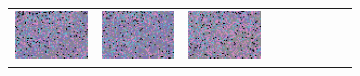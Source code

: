 \documentclass{ipol}
\begin{document}
\begin{figure}[ht]
\begin{subfigure}[t]{\linewidth}
\begin{tabular}{ccccccccc}
                \includegraphics[width=\s]{images/night/AHD/iso_j95_64_grids.png}&
                \includegraphics[width=\s]{images/night/DCB/iso_j95_64_grids.png}&
                \includegraphics[width=\s]{images/night/DHT/iso_j95_64_grids.png}&

\end{tabular}
\end{subfigure}
\end{figure}
\end{document}
